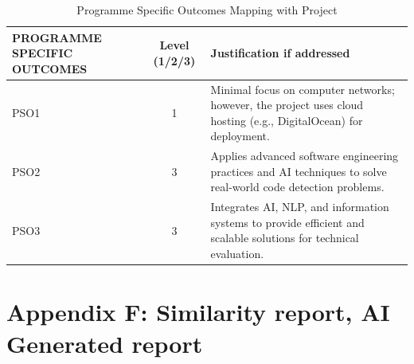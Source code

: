 \documentclass[12pt,a4paper]{report}
\begin{document}
\begin{table}[h!]
\centering
\renewcommand{\arraystretch}{1.3} %
\setlength{\tabcolsep}{6pt}       %
\begin{tabular}{|p{3cm}|c|p{8cm}|}
\hline
\textbf{PROGRAMME SPECIFIC OUTCOMES} & \textbf{Level (1/2/3)} & \textbf{Justification if addressed} \\
\hline
PSO1 & 1 & Minimal focus on computer networks; however, the project uses cloud hosting (e.g., DigitalOcean) for deployment. \\
\hline
PSO2 & 3 & Applies advanced software engineering practices and AI techniques to solve real-world code detection problems. \\
\hline
PSO3 & 3 & Integrates AI, NLP, and information systems to provide efficient and scalable solutions for technical evaluation. \\
\hline
\end{tabular}
\caption{Programme Specific Outcomes Mapping with Project}
\end{table}
\clearpage

\section {Appendix F: Similarity report, AI Generated report}
\clearpage
\end{document}
